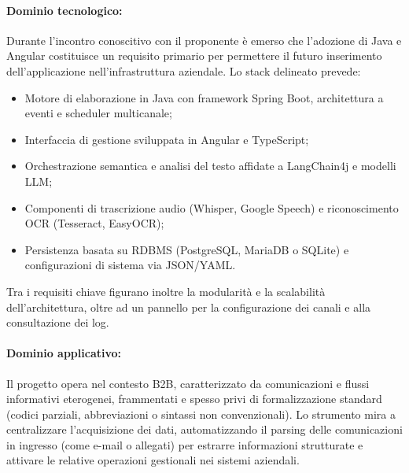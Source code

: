 \paragraph{Dominio tecnologico:}
Durante l'incontro conoscitivo con il proponente è emerso che l'adozione di Java e Angular costituisce un requisito primario per permettere il futuro inserimento dell'applicazione nell'infrastruttura aziendale. Lo stack delineato prevede:
\begin{itemize}
    \item Motore di elaborazione in Java con framework Spring Boot, architettura a eventi e scheduler multicanale;
    \item Interfaccia di gestione sviluppata in Angular e TypeScript;
    \item Orchestrazione semantica e analisi del testo affidate a LangChain4j e modelli LLM;
    \item Componenti di trascrizione audio (Whisper, Google Speech) e riconoscimento OCR (Tesseract, EasyOCR);
    \item Persistenza basata su RDBMS (PostgreSQL, MariaDB o SQLite) e configurazioni di sistema via JSON/YAML.
\end{itemize}
Tra i requisiti chiave figurano inoltre la modularità e la scalabilità dell'architettura, oltre ad un pannello per la configurazione dei canali e alla consultazione dei log.
\paragraph{Dominio applicativo:}
Il progetto opera nel contesto B2B, caratterizzato da comunicazioni e flussi informativi eterogenei, frammentati e spesso privi di formalizzazione standard (codici parziali, abbreviazioni o sintassi non convenzionali). Lo strumento mira a centralizzare l'acquisizione dei dati, automatizzando il parsing delle comunicazioni in ingresso (come e-mail o allegati) per estrarre informazioni strutturate e attivare le relative operazioni gestionali nei sistemi aziendali.

